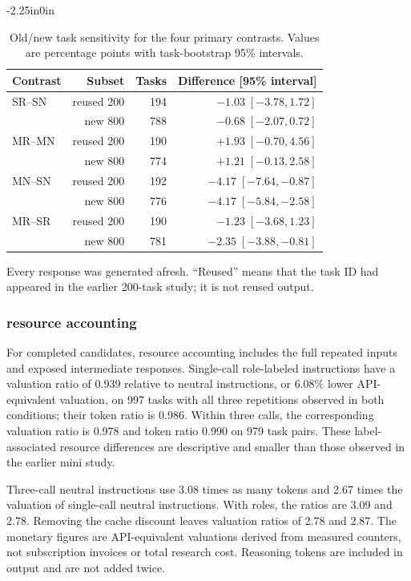 \documentclass[10pt,letterpaper]{article}
\begin{document}
\FloatBarrier
\begin{table}[!ht]
\begin{adjustwidth}{-2.25in}{0in}
\caption{Old/new task sensitivity for the four primary contrasts. Values are percentage points with task-bootstrap 95\% intervals.}
\label{tab:subgroup-sensitivity}
\centering\small
\begin{tabular}{@{}lrrr@{}}
\toprule
Contrast & Subset & Tasks & Difference [95\% interval]\\
\midrule
SR--SN & reused 200 & 194 & $-1.03\;[-3.78,1.72]$\\
       & new 800    & 788 & $-0.68\;[-2.07,0.72]$\\
MR--MN & reused 200 & 190 & $+1.93\;[-0.70,4.56]$\\
       & new 800    & 774 & $+1.21\;[-0.13,2.58]$\\
MN--SN & reused 200 & 192 & $-4.17\;[-7.64,-0.87]$\\
       & new 800    & 776 & $-4.17\;[-5.84,-2.58]$\\
MR--SR & reused 200 & 190 & $-1.23\;[-3.68,1.23]$\\
       & new 800    & 781 & $-2.35\;[-3.88,-0.81]$\\
\bottomrule
\end{tabular}
\par\smallskip\noindent Every response was generated afresh. ``Reused'' means that the task ID had appeared in the earlier 200-task study; it is not reused output.
\end{adjustwidth}
\end{table}
\FloatBarrier



\subsubsection*{resource accounting}
For completed candidates, resource accounting includes the full repeated inputs and exposed intermediate responses. Single-call role-labeled instructions have a valuation ratio of 0.939 relative to neutral instructions, or 6.08\% lower API-equivalent valuation, on 997 tasks with all three repetitions observed in both conditions; their token ratio is 0.986. Within three calls, the corresponding valuation ratio is 0.978 and token ratio 0.990 on 979 task pairs. These label-associated resource differences are descriptive and smaller than those observed in the earlier mini study.

Three-call neutral instructions use 3.08 times as many tokens and 2.67 times the valuation of single-call neutral instructions. With roles, the ratios are 3.09 and 2.78. Removing the cache discount leaves valuation ratios of 2.78 and 2.87. The monetary figures are API-equivalent valuations derived from measured counters, not subscription invoices or total research cost. Reasoning tokens are included in output and are not added twice.
\end{document}
